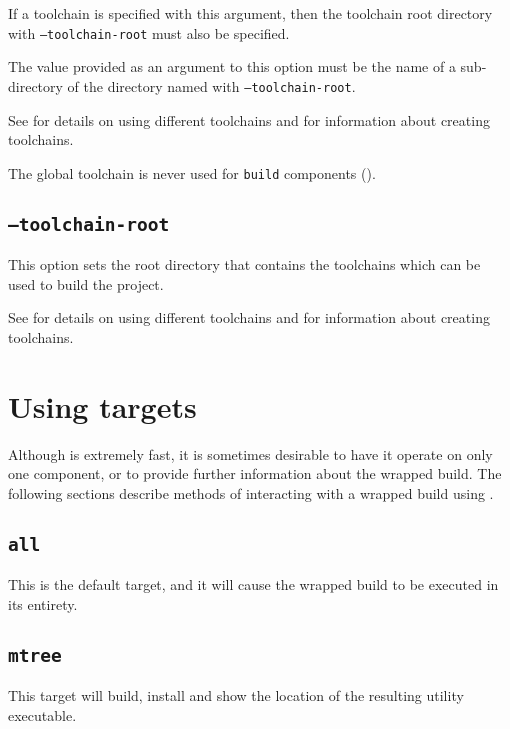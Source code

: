 If a toolchain is specified with this argument, then the toolchain
root directory with \texttt{--toolchain-root} must also be specified.

The value provided as an argument to this option must be the name of a
sub-directory of the directory named with \texttt{--toolchain-root}.

See  for details on using different
toolchains and  for information
about creating toolchains.

The global toolchain is never used for \texttt{build} components
().

\subsection{\texttt{--toolchain-root}}\label{usinglmsbw:toolchain-root}

This option sets the root directory that contains the toolchains which
can be used to build the project.

See  for details on using different
toolchains and  for information
about creating toolchains.

\section{Using \lmsbw targets}\label{usinglmsbw:target:verbs}

Although \lmsbw is extremely fast, it is sometimes desirable to have
it operate on only one component, or to provide further information
about the wrapped build.  The following sections describe methods of
interacting with a wrapped build using \lmsbw.

\subsection{\texttt{all}}\label{usinglmsbw:target:all}

This is the default target, and it will cause the wrapped build to be
executed in its entirety.

\subsection{\texttt{mtree}}

This target will build, install and show the location of the resulting
\mtree utility executable.

